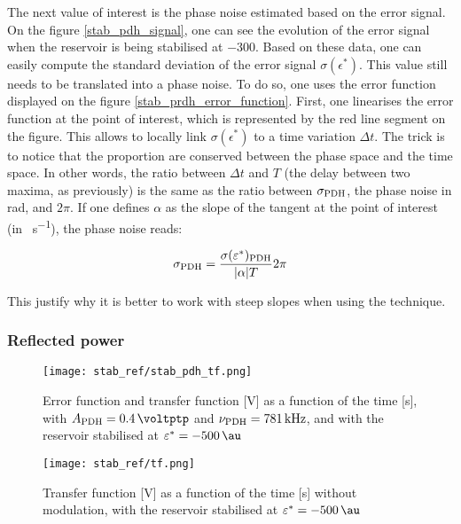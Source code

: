 The next value of interest is the phase noise estimated based on the error signal. On the figure \ref{stab_pdh_signal}, one can see the evolution of the \pdh error signal when the reservoir is being stabilised at \SI{-300}{\au}. Based on these data, one can easily compute the standard deviation of the error signal $\sigma(\epsilon^*)$. This value still needs to be translated into a phase noise. To do so, one uses the error function displayed on the figure \ref{stab_prdh_error_function}. First, one linearises the error function at the point of interest, which is represented by the red line segment on the figure. This allows to locally link $\sigma(\epsilon^*)$ to a time variation $\Delta t$. The trick is to notice that the proportion are conserved between the phase space and the time space. In other words, the ratio between $\Delta t$ and $T$ (the delay between two maxima, as previously) is the same as the ratio between $\sigma_{\text{PDH}}$, the phase noise in \si{\radian}, and $2\pi$. If one defines $\alpha$ as the slope of the tangent at the point of interest (in \si{\au\per\second}), the phase noise reads:

\begin{equation}
	\sigma_{\text{PDH}} = \frac{\sigma(\varepsilon^*)_{\text{PDH}} }{|\alpha| T} 2\pi
\end{equation}

This justify why it is better to work with steep slopes when using the \pdh technique.


\subsubsection{Reflected power}

\begin{figure}
	\centering
	\texttt{[image: stab\_ref/stab\_pdh\_tf.png]}
	\caption{Error function and transfer function [\si{\volt}] as a function of the time [\si{\second}], with $\tind{A}{PDH} = \SI{0.4}{\voltptp}$ and $\nu_{\text{PDH}} = \SI{781}{\kilo\hertz}$, and with the reservoir stabilised at $\epsilon^* = \SI{-500}{\au}$}
	\label{stab_ref_pdh_tf}
\end{figure}

\begin{figure}
	\centering
	\texttt{[image: stab\_ref/tf.png]}
	\caption{Transfer function [\si{\volt}] as a function of the time [\si{\second}] without \pdh modulation, with the reservoir stabilised at $\epsilon^* = \SI{-500}{\au}$}
	\label{stab_ref_tf}
\end{figure}

